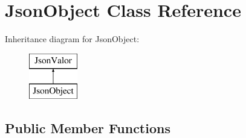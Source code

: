 \hypertarget{classJsonObject}{}\section{Json\+Object Class Reference}
\label{classJsonObject}
Inheritance diagram for Json\+Object\+:\begin{figure}[H]
\begin{center}
\leavevmode
\includegraphics[height=2.000000cm]{classJsonObject}
\end{center}
\end{figure}
\subsection*{Public Member Functions}
